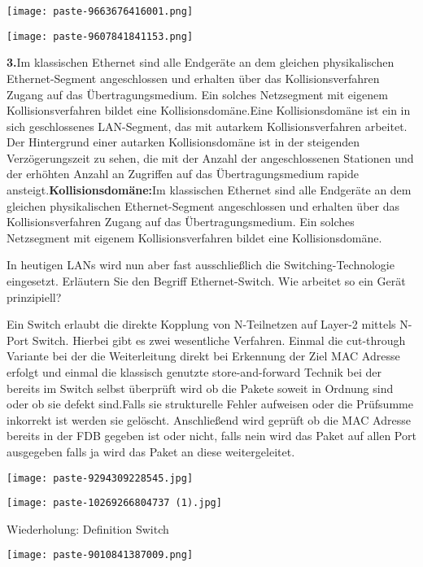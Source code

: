 \documentclass{article}
\begin{document}
\begin{tcolorbox}[colback=white!10!white,colframe=lightgray!75!black,
  savelowerto=\jobname_ex.tex,breakable,enhanced,lines before break=40]
\begin{center}
\texttt{[image: paste-9663676416001.png]}
\end{center}
\begin{center}
\texttt{[image: paste-9607841841153.png]}
\end{center}
\textbf{3.}Im klassischen Ethernet sind alle Endgeräte an dem gleichen physikalischen Ethernet-Segment angeschlossen und erhalten über das Kollisionsverfahren Zugang auf das Übertragungsmedium. Ein solches Netzsegment mit eigenem Kollisionsverfahren bildet eine Kollisionsdomäne.Eine Kollisionsdomäne ist ein in sich geschlossenes LAN-Segment, das mit autarkem Kollisionsverfahren arbeitet. Der Hintergrund einer autarken Kollisionsdomäne ist in der steigenden Verzögerungszeit zu sehen, die mit der Anzahl der angeschlossenen Stationen und der erhöhten Anzahl an Zugriffen auf das Übertragungsmedium rapide ansteigt.\textbf{Kollisionsdomäne:}Im klassischen Ethernet sind alle Endgeräte an dem gleichen physikalischen Ethernet-Segment angeschlossen und erhalten über das Kollisionsverfahren Zugang auf das Übertragungsmedium. Ein solches Netzsegment mit eigenem Kollisionsverfahren bildet eine Kollisionsdomäne.
\end{tcolorbox}
\begin{tcolorbox}[colback=white!10!white,colframe=lightgray!75!black,
  savelowerto=\jobname_ex.tex,breakable,enhanced,lines before break=40]

\justifying
In heutigen LANs wird nun aber fast ausschließlich die Switching-Technologie eingesetzt. Erläutern Sie den Begriff Ethernet-Switch. Wie arbeitet so ein Gerät prinzipiell?

\tcblower

\justifying
Ein Switch erlaubt die direkte Kopplung von N-Teilnetzen auf Layer-2 mittels N-Port Switch. Hierbei gibt es zwei wesentliche Verfahren. Einmal die cut-through Variante bei der die Weiterleitung direkt bei Erkennung der Ziel MAC Adresse erfolgt und einmal die klassisch genutzte store-and-forward Technik bei der bereits im Switch selbst überprüft wird ob die Pakete soweit in Ordnung sind oder ob sie defekt sind.Falls sie strukturelle Fehler aufweisen oder die Prüfsumme inkorrekt ist werden sie gelöscht. Anschließend wird geprüft ob die MAC Adresse bereits in der FDB gegeben ist oder nicht, falls nein wird das Paket auf allen Port ausgegeben falls ja wird das Paket an diese weitergeleitet.\begin{center}
\texttt{[image: paste-9294309228545.jpg]}
\end{center}
\begin{center}
\texttt{[image: paste-10269266804737 (1).jpg]}
\end{center}
Wiederholung: Definition Switch\begin{center}
\texttt{[image: paste-9010841387009.png]}
\end{center}

\end{tcolorbox}
\end{document}
